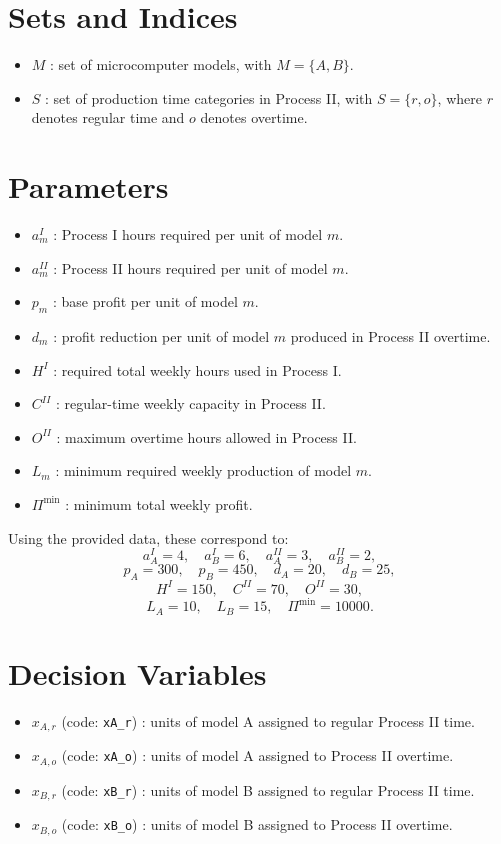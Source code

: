 \section*{Sets and Indices}

\begin{itemize}
    \item $M$ : set of microcomputer models, with $M=\{A,B\}$.
    \item $S$ : set of production time categories in Process II, with $S=\{r,o\}$, where $r$ denotes regular time and $o$ denotes overtime.
\end{itemize}

\section*{Parameters}

\begin{itemize}
    \item $a^{I}_m$ : Process I hours required per unit of model $m$.
    \item $a^{II}_m$ : Process II hours required per unit of model $m$.
    \item $p_m$ : base profit per unit of model $m$.
    \item $d_m$ : profit reduction per unit of model $m$ produced in Process II overtime.
    \item $H^{I}$ : required total weekly hours used in Process I.
    \item $C^{II}$ : regular-time weekly capacity in Process II.
    \item $O^{II}$ : maximum overtime hours allowed in Process II.
    \item $L_m$ : minimum required weekly production of model $m$.
    \item $\Pi^{\min}$ : minimum total weekly profit.
\end{itemize}

Using the provided data, these correspond to:
\[
a^{I}_A=4,\quad a^{I}_B=6,\quad
a^{II}_A=3,\quad a^{II}_B=2,
\]
\[
p_A=300,\quad p_B=450,\quad
d_A=20,\quad d_B=25,
\]
\[
H^{I}=150,\quad C^{II}=70,\quad O^{II}=30,
\]
\[
L_A=10,\quad L_B=15,\quad \Pi^{\min}=10000.
\]

\section*{Decision Variables}

\begin{itemize}
    \item $x_{A,r}$ (code: \texttt{xA\_r}) : units of model A assigned to regular Process II time.
    \item $x_{A,o}$ (code: \texttt{xA\_o}) : units of model A assigned to Process II overtime.
    \item $x_{B,r}$ (code: \texttt{xB\_r}) : units of model B assigned to regular Process II time.
    \item $x_{B,o}$ (code: \texttt{xB\_o}) : units of model B assigned to Process II overtime.
\end{itemize}

